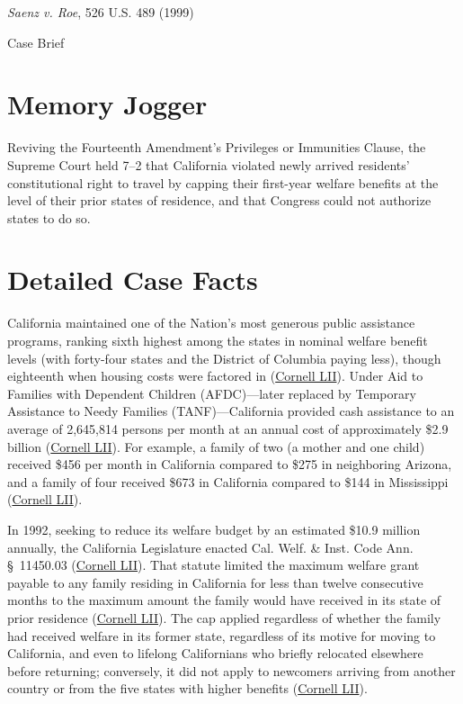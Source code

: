 \documentclass[12pt]{article}
\begin{document}
\begin{center}
{\LARGE \textit{Saenz v. Roe}, 526 U.S. 489 (1999)\par}
\vspace{0.8em}
{\large Case Brief\par}
\end{center}
\vspace{1em}

\section{Memory Jogger}

Reviving the Fourteenth Amendment's Privileges or Immunities Clause, the Supreme Court held 7--2 that California violated newly arrived residents' constitutional right to travel by capping their first-year welfare benefits at the level of their prior states of residence, and that Congress could not authorize states to do so.

\section{Detailed Case Facts}

California maintained one of the Nation's most generous public assistance programs, ranking sixth highest among the states in nominal welfare benefit levels (with forty-four states and the District of Columbia paying less), though eighteenth when housing costs were factored in (\href{https://www.law.cornell.edu/supremecourt/text/98-97}{Cornell LII}). Under Aid to Families with Dependent Children (AFDC)---later replaced by Temporary Assistance to Needy Families (TANF)---California provided cash assistance to an average of 2,645,814 persons per month at an annual cost of approximately \$2.9 billion (\href{https://www.law.cornell.edu/supremecourt/text/98-97}{Cornell LII}). For example, a family of two (a mother and one child) received \$456 per month in California compared to \$275 in neighboring Arizona, and a family of four received \$673 in California compared to \$144 in Mississippi (\href{https://www.law.cornell.edu/supremecourt/text/98-97}{Cornell LII}).

In 1992, seeking to reduce its welfare budget by an estimated \$10.9 million annually, the California Legislature enacted Cal. Welf. \& Inst. Code Ann. \S~11450.03 (\href{https://www.law.cornell.edu/supremecourt/text/98-97}{Cornell LII}). That statute limited the maximum welfare grant payable to any family residing in California for less than twelve consecutive months to the maximum amount the family would have received in its state of prior residence (\href{https://www.law.cornell.edu/supremecourt/text/98-97}{Cornell LII}). The cap applied regardless of whether the family had received welfare in its former state, regardless of its motive for moving to California, and even to lifelong Californians who briefly relocated elsewhere before returning; conversely, it did not apply to newcomers arriving from another country or from the five states with higher benefits (\href{https://www.law.cornell.edu/supremecourt/text/98-97}{Cornell LII}).
\end{document}
